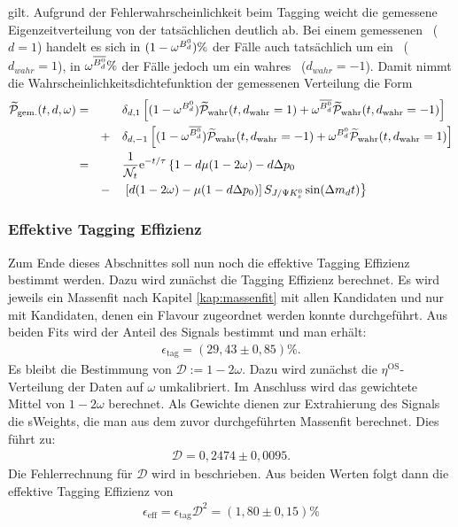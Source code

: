 gilt. Aufgrund der Fehlerwahrscheinlichkeit beim Tagging weicht die gemessene Eigenzeitverteilung von der tatsächlichen deutlich ab. Bei einem gemessenen \Bd\ ($d=1$) handelt es sich in $(1-\omega^{\text{$B_d^0$}})\%$ der Fälle auch tatsächlich um ein \Bd\ ($d_{wahr}=1$), in $\omega^{\text{$\overline{B_d^0}$}}\%$ der Fälle jedoch um ein wahres \Bdbar\ ($d_{wahr}=-1$). Damit nimmt die Wahrscheinlichkeitsdichtefunktion der gemessenen Verteilung die Form
\begin{alignat}{3}
\nonumber\widetilde{\mathcal{P}}_{\text{gem.}}(t, d, \omega) &= && &&\delta_{d,1} \left[(1-\omega^{\text{$B_d^0$}})\widetilde{\mathcal{P}}_{\text{wahr}}(t, d_{\text{wahr}}=1) + \omega^{\text{$\overline{B_d^0}$}}\widetilde{\mathcal{P}}_{\text{wahr}}(t, d_{\text{wahr}}=-1)\right]\\
\nonumber & && + &&\delta_{d,-1} \left[(1-\omega^{\text{$\overline{B_d^0}$}})\widetilde{\mathcal{P}}_{\text{wahr}}(t, d_{\text{wahr}}=-1) + \omega^{\text{$B_d^0$}}\widetilde{\mathcal{P}}_{\text{wahr}}(t, d_{\text{wahr}}=1)\right] \\
\nonumber &= && &&\frac{1}{\mathcal{N}_t}\mathrm{e}^{-t/\tau} \left\lbrace 1-d\mu(1-2\omega)-d\Delta p_0 \right. \\
& && - && \left.\left[d(1-2\omega)-\mu(1-d\Delta p_0)\right]S_{J/\Psi K_s^0}\sin(\Delta m_d t)\right\rbrace \label{eq:fit_pdf_vorlaeufig}
\end{alignat}

\subsubsection{Effektive Tagging Effizienz}
Zum Ende dieses Abschnittes soll nun noch die effektive Tagging Effizienz bestimmt werden. Dazu wird zunächst die Tagging Effizienz berechnet. Es wird jeweils ein Massenfit nach Kapitel \ref{kap:massenfit} mit allen Kandidaten und nur mit Kandidaten, denen ein Flavour zugeordnet werden konnte durchgeführt. Aus beiden Fits wird der Anteil des Signals bestimmt und man erhält:
\begin{align}
\epsilon_{\text{tag}} = (29,43\pm 0,85)\%.
\end{align}
Es bleibt die Bestimmung von $\mathcal{D}:=1-2\omega$. Dazu wird zunächst die $\eta^{\text{OS}}$-Verteilung der Daten auf $\omega$ umkalibriert. Im Anschluss wird das gewichtete Mittel von $1-2\omega$ berechnet. Als Gewichte dienen zur Extrahierung des Signals die sWeights, die man aus dem zuvor durchgeführten Massenfit berechnet. Dies führt zu:
\begin{align}
\mathcal{D} = 0,2474\pm 0,0095.
\end{align}
Die Fehlerrechnung für $\mathcal{D}$ wird in \cite{2010-analyse} beschrieben. Aus beiden Werten folgt dann die effektive Tagging Effizienz von
\begin{align}
\epsilon_{\text{eff}} = \epsilon_{\text{tag}} \mathcal{D}^2 = (1,80\pm 0,15)\%
\end{align}

